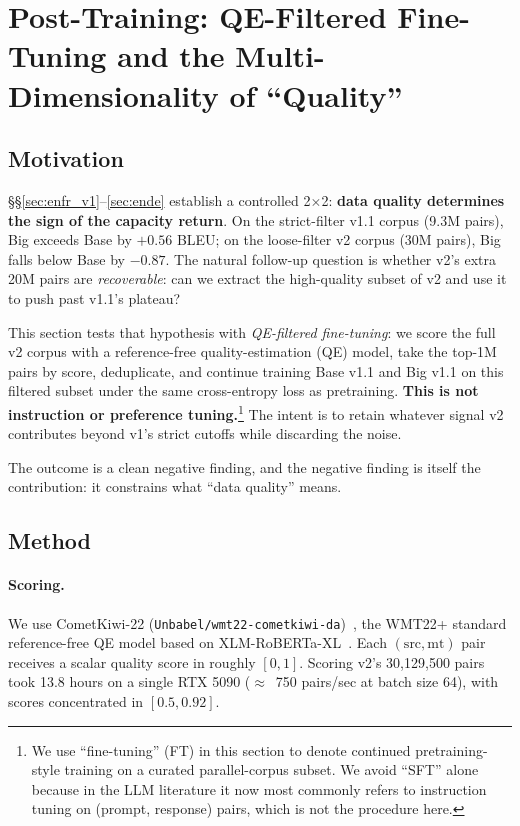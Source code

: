 \section{Post-Training: QE-Filtered Fine-Tuning and the Multi-Dimensionality of ``Quality''}
\label{sec:sft}

\subsection{Motivation}
\S\S\ref{sec:enfr_v1}--\ref{sec:ende} establish a controlled 2$\times$2: \textbf{data quality determines the sign of the capacity return}. On the strict-filter v1.1 corpus (9.3M pairs), Big exceeds Base by $+0.56$ BLEU; on the loose-filter v2 corpus (30M pairs), Big falls below Base by $-0.87$. The natural follow-up question is whether v2's extra 20M pairs are \emph{recoverable}: can we extract the high-quality subset of v2 and use it to push past v1.1's plateau?

This section tests that hypothesis with \emph{QE-filtered fine-tuning}: we score the full v2 corpus with a reference-free quality-estimation (QE) model, take the top-1M pairs by score, deduplicate, and continue training Base v1.1 and Big v1.1 on this filtered subset under the same cross-entropy loss as pretraining. \textbf{This is not instruction or preference tuning.}\footnote{We use ``fine-tuning'' (FT) in this section to denote continued pretraining-style training on a curated parallel-corpus subset. We avoid ``SFT'' alone because in the LLM literature it now most commonly refers to instruction tuning on (prompt, response) pairs, which is not the procedure here.} The intent is to retain whatever signal v2 contributes beyond v1's strict cutoffs while discarding the noise.

The outcome is a clean negative finding, and the negative finding is itself the contribution: it constrains what ``data quality'' means.

\subsection{Method}
\paragraph{Scoring.} We use CometKiwi-22 (\texttt{Unbabel/wmt22-cometkiwi-da})~\cite{rei2022cometkiwi}, the WMT22+ standard reference-free QE model based on XLM-RoBERTa-XL~\cite{conneau2020unsupervised}. Each $(\text{src}, \text{mt})$ pair receives a scalar quality score in roughly $[0, 1]$. Scoring v2's 30{,}129{,}500 pairs took 13.8 hours on a single RTX 5090 ($\approx$~750 pairs/sec at batch size 64), with scores concentrated in $[0.5, 0.92]$.

